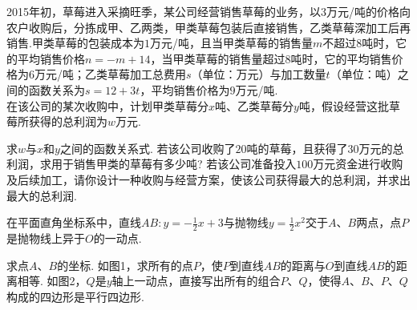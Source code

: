 \documentclass[10pt]{article}
\begin{document}
\begin{questions}{\answeringintroduction}
\begin{subquestions}
    \end{subquestions}
    \begin{figure}[!htb]
        \raggedleft
    \end{figure}
    \question 2015年初，草莓进入采摘旺季，某公司经营销售草莓的业务，以$3$万元/吨的价格向农户收购后，分拣成甲、乙两类，甲类草莓包装后直接销售，乙类草莓深加工后再销售.甲类草莓的包装成本为$1$万元/吨，且当甲类草莓的销售量$m$不超过$8$吨时，它的平均销售价格$n = - m + 14$，当甲类草莓的销售量超过$8$吨时，它的平均销售价格为$6$万元/吨；乙类草莓加工总费用$s$（单位：万元）与加工数量$t$（单位：吨）之间的函数关系为$s = 12 + 3t$，平均销售价格为$9$万元/吨. \\
    在该公司的某次收购中，计划甲类草莓分$x$吨、乙类草莓分$y$吨，假设经营这批草莓所获得的总利润为$w$万元.
    \begin{subquestions}
        \subquestion 求$w$与$x$和$y$之间的函数关系式.
        \subquestion 若该公司收购了$20$吨的草莓，且获得了$30$万元的总利润，求用于销售甲类的草莓有多少吨?
        \subquestion 若该公司准备投入$100$万元资金进行收购及后续加工，请你设计一种收购与经营方案，使该公司获得最大的总利润，并求出最大的总利润.
    \end{subquestions}
    \newpage
    \question 在平面直角坐标系中，直线$AB:y=-\frac{1}{2}x+3$与抛物线$y=\frac{1}{2}x^2$交于$A$、$B$两点，点$P$是抛物线上异于$O$的一动点.
    \begin{subquestions}
        \subquestion 求点$A$、$B$的坐标.
        \subquestion 如图1，求所有的点$P$，使$P$到直线$AB$的距离与$O$到直线$AB$的距离相等.
        \subquestion 如图2，$Q$是$y$轴上一动点，直接写出所有的组合$P$、$Q$，使得$A$、$B$、$P$、$Q$构成的四边形是平行四边形.
    \end{subquestions}
    \begin{figure}[!htb]

\end{figure}
\end{questions}
\end{document}
